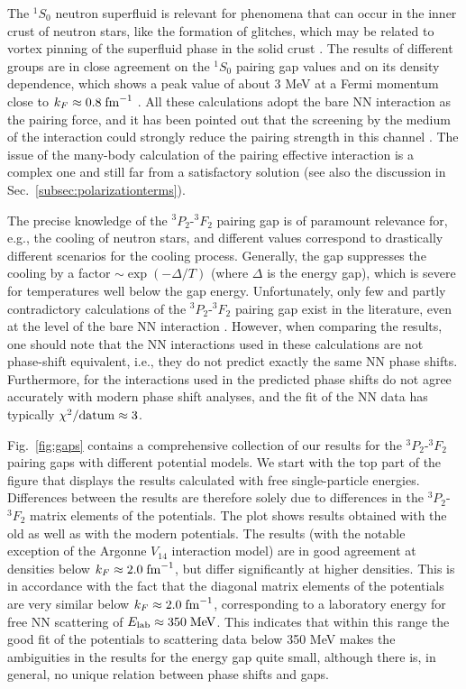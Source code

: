 \documentclass[preprint,rmp,aps,floatfix]{revtex4}
\begin{document}
The $^1S_0$ neutron superfluid is relevant for phenomena
that can occur in the inner crust of neutron stars, like the 
formation of glitches, which may be related to vortex pinning  
of the superfluid phase in the solid crust \cite{glitch}. 
The results of different groups are in close agreement
on the $^1S_0$ pairing gap values and on 
its density dependence, which
shows a peak value of about 3 MeV at a Fermi momentum close to
$k_F \approx 0.8\; {\rm fm}^{-1}$ \cite{bcll90,kkc96,eh98,sclbl96}. 
All these calculations adopt the bare
NN interaction as the pairing force, and it has been pointed out
that the screening by the medium of the interaction 
could strongly reduce
the pairing strength in this channel \cite{sclbl96,chen86,ains89a,ains89b}. 
The issue of the 
many-body calculation of the pairing 
effective interaction is a complex
one and still far from a satisfactory solution (see
also the discussion in Sec.~\ref{subsec:polarizationterms}).


The precise knowledge of the $^3P_2$-$^3F_2$ pairing gap is of 
paramount relevance for, e.g., the cooling of neutron stars, 
and different values correspond to drastically
different scenarios for the cooling process.
Generally, the gap suppresses the cooling by a factor
$\sim\exp(-\Delta/T)$ (where $\Delta$ is the energy gap),
which is severe for
temperatures well below the gap energy.
Unfortunately, only few and partly
contradictory calculations of the $^3P_2$-$^3F_2$ 
pairing gap exist in the literature, 
even at the level of the bare NN interaction 
\cite{amu85,bcll92,taka93,elga96,kkc96}. 
However, when comparing the results, one should note that the  
NN interactions used in these calculations are not phase-shift 
equivalent, i.e.,  they do not 
predict exactly the same NN phase shifts.  
Furthermore, for the interactions used in 
\cite{amu85,bcll92,taka93,elga96} the predicted 
phase shifts do not agree accurately with modern phase shift 
analyses, and the fit of the NN data has typically 
$\chi^2/{\rm datum}\approx 3$.  

Fig.~\ref{fig:gaps} contains a comprehensive collection of our results for
the $^3P_2$-$^3F_2$ pairing gaps with different potential models. 
We start with the top part of the figure that displays the results
calculated with free single-particle energies.  
Differences between the results are therefore solely due to differences 
in the $^3P_2$-$^3F_2$ matrix elements of the potentials.
The plot shows results obtained with the old as well as with the modern
potentials.
The results (with the notable exception of 
the Argonne $V_{14}$ interaction model)
are in good agreement at densities below $k_F\approx 2.0\;{\rm fm}^{-1}$, 
but differ significantly at higher densities.  
This is in accordance with the fact that 
the diagonal matrix elements of the potentials are very similar 
below $k_F\approx 2.0\;{\rm fm}^{-1}$, corresponding  
to a laboratory energy for free NN scattering 
of $E_{\rm lab} \approx 350\;{\rm MeV}$.  
This indicates that
within this range the good fit of the potentials 
to scattering data below 350 MeV makes the ambiguities in the 
results for the energy gap quite small,
although there is, in general, no unique relation between phase shifts and gaps.
\end{document}
